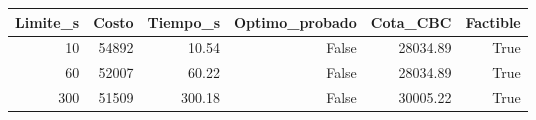 \begin{tabular}{rrrrrr}
\toprule
Limite_s & Costo & Tiempo_s & Optimo_probado & Cota_CBC & Factible \\
\midrule
10 & 54892 & 10.54 & False & 28034.89 & True \\
60 & 52007 & 60.22 & False & 28034.89 & True \\
300 & 51509 & 300.18 & False & 30005.22 & True \\
\bottomrule
\end{tabular}
